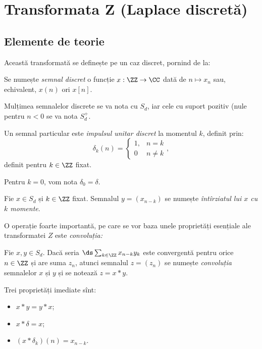 
\chapter{Transformata Z (Laplace discretă)}

\section{Elemente de teorie}

Această transformată se definește pe un caz discret, pornind de la:
\begin{definition}\label{def:semnal}
  Se numește \emph{semnal discret} o funcție $ x : \ZZ \to \CC $ dată
  de $ n \mapsto x_n $ sau, echivalent, $ x(n) $ ori $ x[n] $.
\end{definition}

Mulțimea semnalelor discrete se va nota cu $ S_d $, iar cele cu suport pozitiv
(nule pentru $ n < 0 $ se va nota $ S_d^+ $.

Un semnal particular este \emph{impulsul unitar discret} la momentul $ k $,
definit prin:
\[
  \delta_k(n) = \begin{cases} 1, & n = k \\ 0 & n \neq k \end{cases},
\]
definit pentru $ k \in \ZZ $ fixat.

Pentru $ k = 0 $, vom nota $ \delta_0 = \delta $.

\begin{definition}\label{def:intirziat} 
  Fie $ x \in S_d $ și $ k \in \ZZ $ fixat. Semnalul $ y = (x_{n-k}) $ se numește
  \emph{întîrziatul lui $ x $ cu $ k $ momente}.
\end{definition}

O operație foarte importantă, pe care se vor baza unele proprietăți esențiale ale
transformatei $ Z $ este \emph{convoluția:} 
\begin{definition}\label{def:convolutie}
  Fie $ x, y \in S_d $. Dacă seria $ \ds\sum_{k \in \ZZ} x_{n-k} y_k $
  este convergentă pentru orice $ n \in \ZZ $ și are suma $ z_n $, atunci semnalul
  $ z = (z_n) $ se numește \emph{convoluția} semnalelor $ x $ și $ y $ și
  se notează $ z = x \ast y $.
\end{definition}

Trei proprietăți imediate sînt:
\begin{itemize}
\item $ x \ast y = y \ast x $;
\item $ x \ast \delta = x $;
\item $ (x \ast \delta_k)(n) = x_{n - k} $.
\end{itemize}


